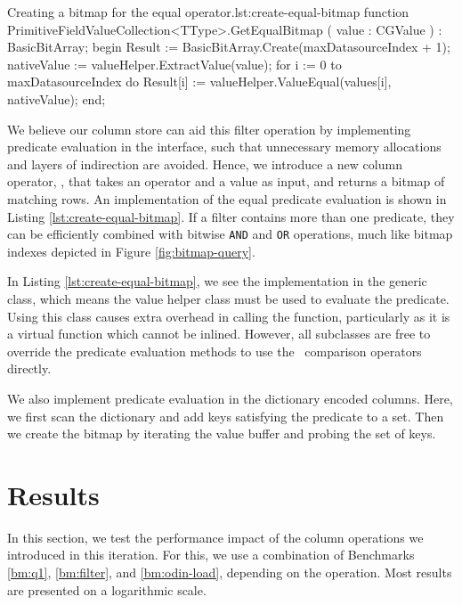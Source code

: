 \begin{delphicode}{Creating a bitmap for the equal operator.}{lst:create-equal-bitmap}
function PrimitiveFieldValueCollection<TType>.GetEqualBitmap
( value : CGValue )
: BasicBitArray;
begin
  Result := BasicBitArray.Create(maxDatasourceIndex + 1);
  nativeValue := valueHelper.ExtractValue(value);
  for i := 0 to maxDatasourceIndex do
    Result[i] := valueHelper.ValueEqual(values[i], nativeValue);
end;
\end{delphicode}

We believe our column store can aid this filter operation by implementing predicate evaluation in the  interface, such that unnecessary memory allocations and layers of indirection are avoided. Hence, we introduce a new column operator, , that takes an operator and a value as input, and returns a bitmap of matching rows. An implementation of the equal predicate evaluation is shown in Listing \ref{lst:create-equal-bitmap}. If a filter contains more than one predicate, they can be efficiently combined with bitwise \texttt{AND} and \texttt{OR} operations, much like bitmap indexes depicted in Figure \ref{fig:bitmap-query}.

In Listing \ref{lst:create-equal-bitmap}, we see the implementation in the generic  class, which means the value helper class must be used to evaluate the predicate. Using this class causes extra overhead in calling the  function, particularly as it is a virtual function which cannot be inlined. However, all  subclasses are free to override the predicate evaluation methods to use the \delphi~comparison operators directly.

We also implement predicate evaluation in the dictionary encoded columns. Here, we first scan the dictionary and add keys satisfying the predicate to a set. Then we create the bitmap by iterating the value buffer and probing the set of keys.

\section{Results}
\label{sec:Results}
In this section, we test the performance impact of the column operations we introduced in this iteration. For this, we use a combination of Benchmarks \ref{bm:q1}, \ref{bm:filter}, and \ref{bm:odin-load}, depending on the operation. Most results are presented on a logarithmic scale.

